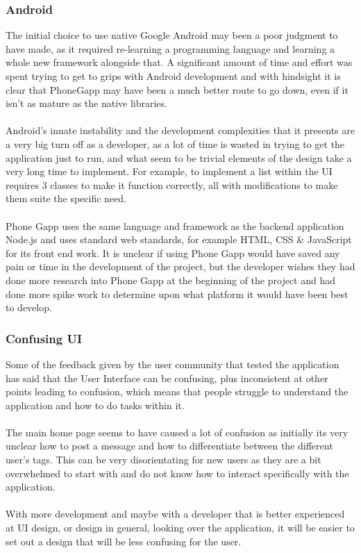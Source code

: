 \subsubsection{Android}

The initial choice to use native Google Android may been a poor judgment to have made, as it required re-learning a programming language and learning a whole new framework alongside that. A significant amount of time and effort was spent trying to get to grips with Android development and with hindsight it is clear that PhoneGapp may have been a much better route to go down, even if it isn't as mature as the native libraries.\\
\\
Android's innate instability and the development complexities that it presents are a very big turn off as a developer, as a lot of time is wasted in trying to get the application just to run, and what seem to be trivial elements of the design take a very long time to implement. For example, to implement a list within the UI requires 3 classes to make it function correctly, all with modifications to make them suite the specific need.\\
\\
Phone Gapp uses the same language and framework as the backend application Node.js and uses standard web standards, for example HTML, CSS \& JavaScript for its front end work. It is unclear if using Phone Gapp would have saved any pain or time in the development of the project, but the developer wishes they had done more research into Phone Gapp at the beginning of the project and had done more spike work to determine upon what platform it would have been best to develop.

\subsubsection{Confusing UI}

Some of the feedback given by the user community that tested the application has said that the User Interface can be confusing, plus inconsistent at other points leading to confusion, which means that people struggle to understand the application and how to do tasks within it.\\
\\
The main home page seems to have caused a lot of confusion as initially its very unclear how to post a message and how to differentiate between the different user's tags. This can be very disorientating for new users as they are a bit overwhelmed to start with and do not know how to interact specifically with the application.\\
\\
With more development and maybe with a developer that is better experienced at UI design, or design in general, looking over the application, it will be easier to set out a design that will be less confusing for the user.

